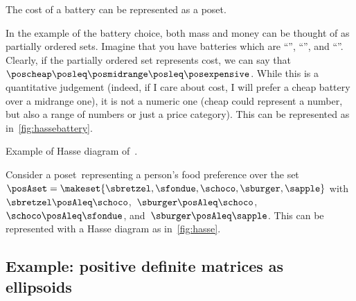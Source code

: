 \vspace{1cm}
\begin{marginfigure}[4mm]
    \centering
    \caption{The cost of a battery can be represented as a poset.
    }
    \label{fig:hassebattery}
\end{marginfigure}
%
\begin{example}
    In the example of the battery choice, both mass and money can be thought of as partially ordered sets.
    Imagine that you have batteries which are ``\poscheap'', ``\posmidrange'', and ``\posexpensive''.
    Clearly, if the partially ordered set represents cost, we can say that~$\poscheap \posleq\posmidrange \posleq\posexpensive$.
    While this is a quantitative judgement (indeed, if I care about cost, I will prefer a cheap battery over a midrange one), it is not a numeric one (cheap could represent a number, but also a range of numbers or just a price category).
    This can be represented as in~\cref{fig:hassebattery}.
\end{example}

\vspace{1cm}
\begin{marginfigure}[4mm]
    \centering
    \caption{Example of Hasse diagram of~\posA.}
    \label{fig:hasse}
\end{marginfigure}
\begin{example}
    Consider a poset~\posA representing a person's food preference over the set~$\posAset=\makeset{\sbretzel,\sfondue,\schoco,\sburger,\sapple}$ with~$\sbretzel\posAleq \schoco$,~$\sburger\posAleq \schoco$,~$\schoco\posAleq \sfondue$, and~$\sburger\posAleq \sapple$.
    This can be represented with a Hasse diagram as in~\cref{fig:hasse}.
\end{example}

\vfill\clearpage

\subsection{Example: positive definite matrices as ellipsoids}

\begin{marginfigure}
    \centering

    \caption{}
    \label{fig:posdef}
\end{marginfigure}

